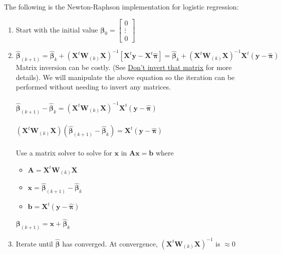 \documentclass{article}
\begin{document}
\noindent The following is the Newton-Raphson implementation for logistic regression:
\begin{enumerate}
    \item Start with the initial value $\boldsymbol{\beta}_0 = \begin{bmatrix} 
    0 \\
    \vdots \\
    0
    \end{bmatrix}$
    \item $\boldsymbol{\hat{\beta}}_{(k+1)} = \boldsymbol{\hat{\beta}}_{k} + (\boldsymbol{X}^t \boldsymbol{W}_{(k)} \boldsymbol{X})^{-1}[\boldsymbol{X}^t\boldsymbol{y} - \boldsymbol{X}^t\boldsymbol{\hat{\pi}}] = \boldsymbol{\hat{\beta}}_{k} + (\boldsymbol{X}^t \boldsymbol{W}_{(k)} \boldsymbol{X})^{-1}\boldsymbol{X}^t(\boldsymbol{y - \hat{\pi}})$
    \\
    Matrix inversion can be costly. (See \href{https://www.johndcook.com/blog/2010/01/19/dont-invert-that-matrix/}{Don't invert that matrix} for more details). We will manipulate the above equation so the iteration can be performed without needing to invert any matrices.
    \\\\
    $\boldsymbol{\hat{\beta}}_{(k+1)} - \boldsymbol{\hat{\beta}}_{k} = (\boldsymbol{X}^t \boldsymbol{W}_{(k)} \boldsymbol{X})^{-1}\boldsymbol{X}^t(\boldsymbol{y - \hat{\pi}})$
    \\\\
    $(\boldsymbol{X}^t \boldsymbol{W}_{(k)} \boldsymbol{X})(\boldsymbol{\hat{\beta}}_{(k+1)} - \boldsymbol{\hat{\beta}}_{k}) = \boldsymbol{X}^t(\boldsymbol{y - \hat{\pi}})$
    \\\\
    Use a matrix solver to solve for $\boldsymbol{x}$ in $\boldsymbol{Ax} = \boldsymbol{b}$ where 
    \begin{itemize}
    \item $\boldsymbol{A} = \boldsymbol{X}^t \boldsymbol{W}_{(k)} \boldsymbol{X}$
    \item $\boldsymbol{x} = \boldsymbol{\hat{\beta}}_{(k+1)} - \boldsymbol{\hat{\beta}}_{k}$
    \item $\boldsymbol{b} = \boldsymbol{X}^t(\boldsymbol{y - \hat{\pi}})$
    \end{itemize}
    
    $\boldsymbol{\beta}_{(k+1)} = \boldsymbol{x} + \boldsymbol{\hat{\beta}}_{k}$
    
    \item Iterate until $\boldsymbol{\hat{\beta}}$ has converged. At convergence, $(\boldsymbol{X}^t \boldsymbol{W}_{(k)} \boldsymbol{X})^{-1}$ is $\approx 0$
\end{enumerate}
\end{document}
